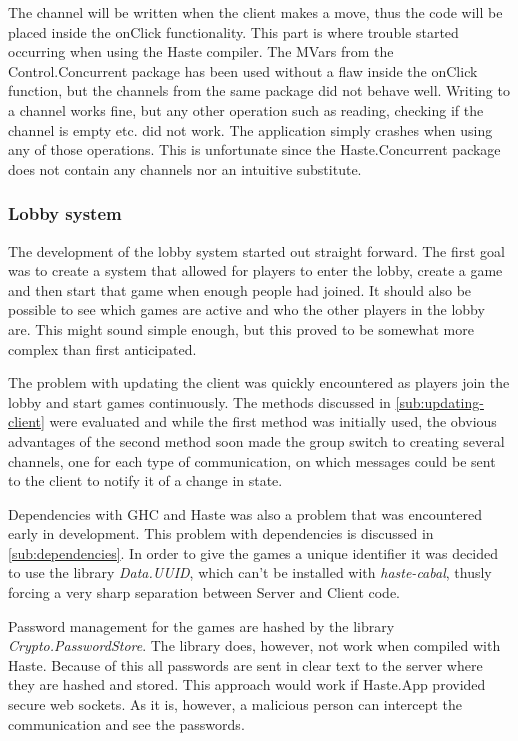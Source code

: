 \documentclass[a4paper]{article}
\begin{document}
The channel will be written when the client makes a move, thus the code will be placed inside the onClick functionality. This part is where trouble started occurring when using the Haste compiler. The MVars from the Control.Concurrent package has been used without a flaw inside the onClick function, but the channels from the same package did not behave well. Writing to a channel works fine, but any other operation such as reading, checking if the channel is empty etc. did not work. The application simply crashes when using any of those operations. This is unfortunate since the Haste.Concurrent package does not contain any channels nor an intuitive substitute.




\subsubsection{Lobby system}
The development of the lobby system started out straight forward. The first goal was to create a system that allowed for players to enter the lobby, create a game and then start that game when enough people had joined. It should also be possible to see which games are active and who the other players in the lobby are. This might sound simple enough, but this proved to be somewhat more complex than first anticipated.

The problem with updating the client was quickly encountered as players join the lobby and start games continuously. The methods discussed in \cref{sub:updating-client} were evaluated and while the first method was initially used, the obvious advantages of the second method soon made the group switch to creating several channels, one for each type of communication, on which messages could be sent to the client to notify it of a change in state.

Dependencies with GHC and Haste was also a problem that was encountered early in development. This problem with dependencies is discussed in \cref{sub:dependencies}. In order to give the games a unique identifier it was decided to use the library \textit{Data.UUID}, which can't be installed with \textit{haste-cabal}, thusly forcing a very sharp separation between Server and Client code.

Password management for the games are hashed by the library \textit{Crypto.PasswordStore}. The library does, however, not work when compiled with Haste. Because of this all passwords are sent in clear text to the server where they are hashed and stored. This approach would work if Haste.App provided secure web sockets. As it is, however, a malicious person can intercept the communication and see the passwords. 
\end{document}
